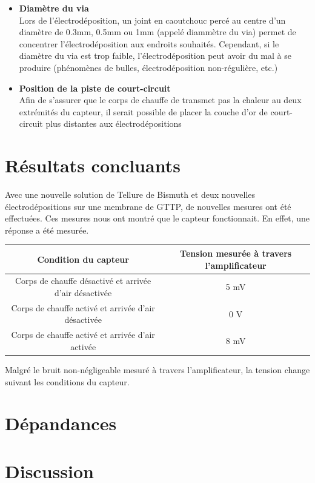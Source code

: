 \begin{itemize}
    \item \textbf{Diamètre du via}\\
          Lors de l'électrodéposition, un joint en caoutchouc percé au centre d'un diamètre de 0.3mm, 0.5mm ou 1mm (appelé diammètre du via) permet de concentrer
          l'électrodéposition aux endroits souhaités. Cependant, si le diamètre du via est trop faible, l'électrodéposition peut avoir du mal à
          se produire (phénomènes de bulles, électrodéposition non-régulière, etc.)\\

    \item \textbf{Position de la piste de court-circuit}\\
          Afin de s'assurer que le corps de chauffe de transmet pas la chaleur au deux extrémités du capteur, il serait possible de placer la couche
          d'or de court-circuit plus distantes aux électrodépositions
\end{itemize}

\section{Résultats concluants}
Avec une nouvelle solution de Tellure de Bismuth et deux nouvelles électrodépositions sur une membrane de GTTP, de nouvelles mesures ont été
effectuées. Ces mesures nous ont montré que le capteur fonctionnait. En effet, une réponse a été mesurée.
\begin{table}[H]
    \begin{center}
        \begin{tabular}{|c|c|}
            \hline
            Condition du capteur                                   & Tension mesurée à travers l'amplificateur \\
            \hline
            Corps de chauffe désactivé et arrivée d'air désactivée & 5 mV                                      \\
            \hline
            Corps de chauffe activé et arrivée d'air désactivée    & 0 V                                       \\
            \hline
            Corps de chauffe activé et arrivée d'air activée       & 8 mV                                      \\
            \hline
        \end{tabular}
    \end{center}
\end{table}
Malgré le bruit non-négligeable mesuré à travers l'amplificateur, la tension change suivant les conditions du capteur.

\section{Dépandances}
\section{Discussion}